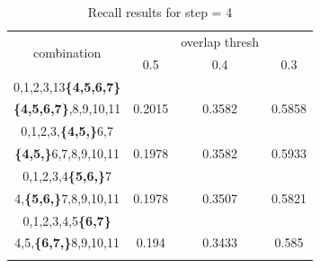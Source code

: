 \documentclass{report}
\begin{document}
\begin{center}
\begin{longtable}{||c||c c c||}

  \hline
  \multirow{2}{5em}{combination} & {} &overlap thresh & {} \\
                                    &  0.5  &  0.4 &  0.3 \\         
  \hline  \hline
  0,1,2,3,13\textbf{\{4,5,6,7\}}                & {} & {} & {} \\
  \textbf{\{4,5,6,7\}},8,9,10,11                & 0.2015   & 0.3582 & 0.5858 \\
  \hline     \hline                          

  0,1,2,3,\textbf{\{4,5,\}}6,7                  & {} & {} & {} \\
  \textbf{\{4,5,\}}6,7,8,9,10,11                & 0.1978   & 0.3582 & 0.5933 \\
  \hline                          
  0,1,2,3,4\textbf{\{5,6,\}}7                   & {} & {} & {} \\
  4,\textbf{\{5,6,\}}7,8,9,10,11                & 0.1978   & 0.3507 & 0.5821 \\
  \hline                          
  0,1,2,3,4,5\textbf{\{6,7\}}                   & {} & {} & {} \\
  4,5,\textbf{\{6,7,\}}8,9,10,11                & 0.194   & 0.3433 & 0.585 \\
  \hline                           
  \caption{Recall results for step = 4}
  \label{table:step4_8}
\end{longtable} 
\end{center}
\end{document}
